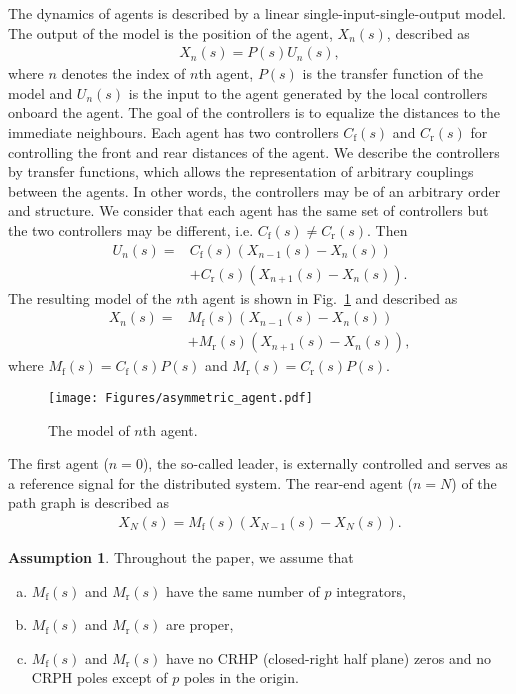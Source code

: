 \documentclass[10pt,twocolumn,twoside]{IEEEtran}
\theoremstyle{definition}
\newtheorem{assumption}{Assumption}
\begin{document}
The dynamics of agents is described by a linear single-input-single-output model. The output of the model is the position of the agent, $X_{n}(s)$, described as
\begin{align}
  X_n(s) = P(s) U_n(s),
\end{align}
where $n$ denotes the index of $n$th agent, $P(s)$ is the transfer function of the model and $U_n(s)$ is the input to the agent generated by the local controllers onboard the agent. The goal of the controllers is to equalize the distances to the immediate neighbours. Each agent has two controllers $C_{\text{f}}(s)$ and $C_{\text{r}}(s)$ for controlling the front and rear distances of the agent. We describe the controllers by transfer functions, which allows the representation of arbitrary couplings between the agents. In other words, the controllers may be of an arbitrary order and structure. We consider that each agent has the same set of controllers but the two controllers may be different, i.e. $C_{\text{f}}(s) \neq C_{\text{r}}(s)$. Then
\begin{align}
  U_n(s) = &C_{\text{f}}(s)\left(X_{n-1}(s) - X_{n}(s)\right)\nonumber\\
   &+ C_{\text{r}}(s) (X_{n+1}(s) - X_{n}(s)).
\end{align}
The resulting model of the $n$th agent is shown in Fig.~\ref{fig:asymmetric_agent} and described as
\begin{align}
  X_{n}(s) = &M_{\text{f}}(s)(X_{n-1}(s)-X_{n}(s)) \nonumber\\
  &+ M_{\text{r}}(s)(X_{n+1}(s)-X_{n}(s)),\label{eq:eq1}
\end{align}
where $M_{\text{f}}(s) = C_{\text{f}}(s)P(s)$ and $M_{\text{r}}(s) = C_{\text{r}}(s)P(s)$.

\begin{figure}[ht]
 \centering
  \texttt{[image: Figures/asymmetric\_agent.pdf]}
  \caption{The model of $n$th agent.}
  \label{fig:asymmetric_agent}
\end{figure}

The first agent ($n=0$), the so-called leader, is externally controlled and serves as a reference signal for the distributed system. The rear-end agent ($n=N$) of the path graph is described as
\begin{align}
  X_{N}(s) = M_{\text{f}}(s)(X_{N-1}(s)-X_{N}(s)).\label{eq:eq2}
\end{align}

\begin{assumption}\label{assum:1}
Throughout the paper, we assume that
  \begin{enumerate}[(a)]
    \item $M_{\text{f}}(s)$ and $M_{\text{r}}(s)$ have the same number of $p$ integrators,
    \item $M_{\text{f}}(s)$ and $M_{\text{r}}(s)$ are proper,
    \item $M_{\text{f}}(s)$ and $M_{\text{r}}(s)$ have no CRHP (closed-right half plane) zeros and no CRPH poles except of $p$ poles in the origin.
  \end{enumerate}
\end{assumption}
\end{document}
